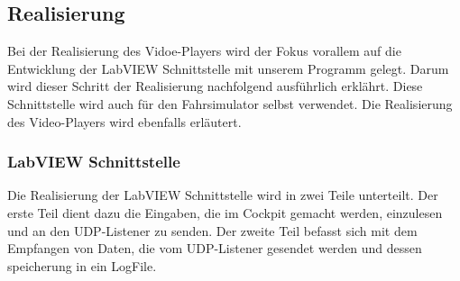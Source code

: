 \subsection{Realisierung}
Bei der Realisierung des Vidoe-Players wird der Fokus vorallem auf die Entwicklung der LabVIEW Schnittstelle mit unserem Programm gelegt. Darum wird dieser Schritt der Realisierung nachfolgend ausführlich erklährt. Diese Schnittstelle wird auch für den Fahrsimulator selbst verwendet. Die Realisierung des Video-Players wird ebenfalls erläutert. 
\subsubsection{LabVIEW Schnittstelle}
Die Realisierung der LabVIEW Schnittstelle wird in zwei Teile unterteilt. Der erste Teil dient dazu die Eingaben, die im Cockpit gemacht werden, einzulesen und an den UDP-Listener zu senden. Der zweite Teil befasst sich mit dem Empfangen von Daten, die vom UDP-Listener gesendet werden und dessen speicherung in ein LogFile. 

